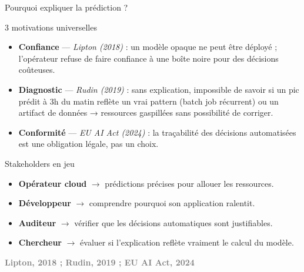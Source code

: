 \documentclass[10pt]{beamer}
\newcommand{\source}[1]{\vspace{4pt}\hfill{\textcolor{gray}{\textbf{\tiny #1}}}}
\begin{document}
\begin{frame}{Pourquoi expliquer la prédiction ?}
	\vspace{-0.2cm}
  \begin{block}{3 motivations universelles}
    \begin{itemize}
      \item \textbf{Confiance} --- \textit{Lipton (2018)} : un modèle opaque ne peut être déployé ; l'opérateur refuse de faire confiance à une boîte noire pour des décisions coûteuses.
      \item \textbf{Diagnostic} --- \textit{Rudin (2019)} : sans explication, impossible de savoir si un pic prédit à 3h du matin reflète un vrai pattern (batch job récurrent) ou un artifact de données → ressources gaspillées sans possibilité de corriger.
      \item \textbf{Conformité} --- \textit{EU AI Act (2024)} : la traçabilité des décisions automatisées est une obligation légale, pas un choix.
    \end{itemize}
  \end{block}
	\vspace{-0.2cm}
  \begin{exampleblock}{Stakeholders en jeu}
    \begin{itemize}
      \item \textbf{Opérateur cloud} $\rightarrow$ prédictions précises pour allouer les ressources.
      \item \textbf{Développeur} $\rightarrow$ comprendre pourquoi son application ralentit.
      \item \textbf{Auditeur} $\rightarrow$ vérifier que les décisions automatiques sont justifiables.
      \item \textbf{Chercheur} $\rightarrow$ évaluer si l'explication reflète vraiment le calcul du modèle.
    \end{itemize}
  \end{exampleblock}
	\vspace{-0.2cm}
  \source{Lipton, 2018 ; Rudin, 2019 ; EU AI Act, 2024}
\end{frame}
\end{document}
